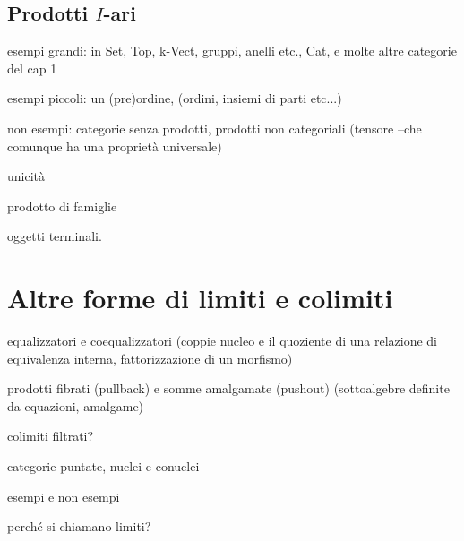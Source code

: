 \subsection{Prodotti \(I\)-ari}



\bigskip
esempi grandi: in Set, Top, k-Vect, gruppi, anelli etc., Cat, e molte altre categorie del cap 1

esempi piccoli: un (pre)ordine, (ordini, insiemi di parti etc...)

non esempi: categorie senza prodotti, prodotti non categoriali (tensore --che comunque ha una proprietà universale)

unicità

prodotto di famiglie

oggetti terminali.


\begin{esercizi}
	\item
	\item
	\item
	\item
	\item
\end{esercizi}
\section{Altre forme di limiti e colimiti}

equalizzatori e coequalizzatori (coppie nucleo e il quoziente di una relazione di equivalenza interna, fattorizzazione di un morfismo)

prodotti fibrati (pullback) e somme amalgamate (pushout) (sottoalgebre definite da equazioni, amalgame)

colimiti filtrati?

categorie puntate, nuclei e conuclei

esempi e non esempi

perché si chiamano limiti?
\begin{remark}
\end{remark}
